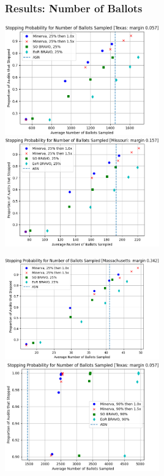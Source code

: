 \documentclass{beamer}
\begin{document}
\begin{frame}
\frametitle{Results: Number of Ballots}

\includegraphics[width=0.5\textwidth]{texas25.png}
\includegraphics[width=0.5\textwidth]{missouri25.png}

\includegraphics[width=0.5\textwidth]{massachusetts25.png}
\includegraphics[width=0.5\textwidth]{texas90.png}
\end{frame}
\end{document}
